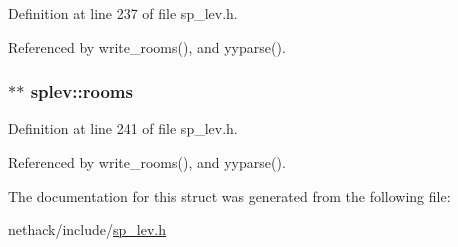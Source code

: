 Definition at line 237 of file sp\+\_\+lev.\+h.



Referenced by write\+\_\+rooms(), and yyparse().

\hypertarget{structsplev_a3a2d15990508c2ead07e23471b8eadcf}{
\subsubsection[{rooms}]{$\ast$$\ast$ splev\+::rooms}}\label{structsplev_a3a2d15990508c2ead07e23471b8eadcf}


Definition at line 241 of file sp\+\_\+lev.\+h.



Referenced by write\+\_\+rooms(), and yyparse().



The documentation for this struct was generated from the following file\+:\begin{DoxyCompactItemize}
\item 
nethack/include/\hyperlink{sp__lev_8h}{sp\+\_\+lev.\+h}\end{DoxyCompactItemize}
